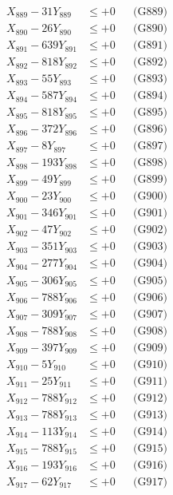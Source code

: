\documentclass[a4paper,10pt]{article}
\begin{document}
{\begin{align}
X_{889} - 31Y_{889} &\leq +0 && \text{(G889)} \\
X_{890} - 26Y_{890} &\leq +0 && \text{(G890)} \\
\allowbreak
X_{891} - 639Y_{891} &\leq +0 && \text{(G891)} \\
X_{892} - 818Y_{892} &\leq +0 && \text{(G892)} \\
X_{893} - 55Y_{893} &\leq +0 && \text{(G893)} \\
X_{894} - 587Y_{894} &\leq +0 && \text{(G894)} \\
X_{895} - 818Y_{895} &\leq +0 && \text{(G895)} \\
X_{896} - 372Y_{896} &\leq +0 && \text{(G896)} \\
X_{897} - 8Y_{897} &\leq +0 && \text{(G897)} \\
X_{898} - 193Y_{898} &\leq +0 && \text{(G898)} \\
X_{899} - 49Y_{899} &\leq +0 && \text{(G899)} \\
X_{900} - 23Y_{900} &\leq +0 && \text{(G900)} \\
\allowbreak
X_{901} - 346Y_{901} &\leq +0 && \text{(G901)} \\
X_{902} - 47Y_{902} &\leq +0 && \text{(G902)} \\
X_{903} - 351Y_{903} &\leq +0 && \text{(G903)} \\
X_{904} - 277Y_{904} &\leq +0 && \text{(G904)} \\
X_{905} - 306Y_{905} &\leq +0 && \text{(G905)} \\
X_{906} - 788Y_{906} &\leq +0 && \text{(G906)} \\
X_{907} - 309Y_{907} &\leq +0 && \text{(G907)} \\
X_{908} - 788Y_{908} &\leq +0 && \text{(G908)} \\
X_{909} - 397Y_{909} &\leq +0 && \text{(G909)} \\
X_{910} - 5Y_{910} &\leq +0 && \text{(G910)} \\
\allowbreak
X_{911} - 25Y_{911} &\leq +0 && \text{(G911)} \\
X_{912} - 788Y_{912} &\leq +0 && \text{(G912)} \\
X_{913} - 788Y_{913} &\leq +0 && \text{(G913)} \\
X_{914} - 113Y_{914} &\leq +0 && \text{(G914)} \\
X_{915} - 788Y_{915} &\leq +0 && \text{(G915)} \\
X_{916} - 193Y_{916} &\leq +0 && \text{(G916)} \\
X_{917} - 62Y_{917} &\leq +0 && \text{(G917)} \\

\end{align}}
\end{document}
